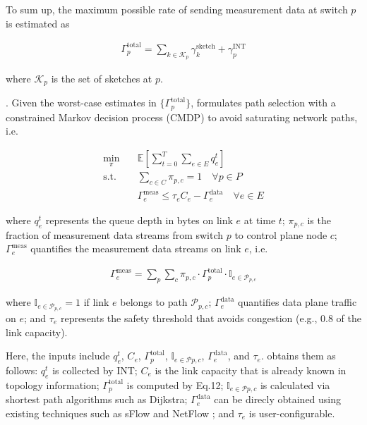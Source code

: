 To sum up, the maximum possible rate of sending measurement data at switch $p$ is estimated as

\vspace{-4pt}
\begin{align}
\Gamma_p^{\text{total}} = \sum_{k \in \mathcal{K}_p} \gamma_k^{\text{sketch}} + \gamma_p^{\text{INT}}
\end{align}

\noindent where $\mathcal{K}_p$ is the set of sketches at $p$. 


. Given the worst-case estimates in $\{\Gamma_p^{\text{total}}\}$, \sysname formulates path selection with a constrained Markov decision process (CMDP) to avoid saturating network paths, i.e.

\vspace{-4pt}
\begin{align}
\min_{\pi}  & \quad \mathbb{E}\left[\sum_{t=0}^T \sum_{e \in E} q_e^t \right] \\
\text{s.t.} & \quad \sum_{c \in C} \pi_{p,c} = 1 \quad \forall p \in P  \\
            & \quad \Gamma_e^{\text{meas}} \leq \tau_e C_e - \Gamma_e^{\text{data}} \quad \forall e \in E 
\end{align}

\noindent where $q_e^t$ represents the queue depth in bytes on link $e$ at time $t$; $\pi_{p,c}$ is the fraction of measurement data streams from switch $p$ to control plane node $c$; $\Gamma_e^{\text{meas}}$ quantifies the measurement data streams on link $e$, i.e. 

\vspace{-4pt}
\begin{align}
    \Gamma_e^{\text{meas}} = \sum_{p} \sum_{c} \pi_{p,c} \cdot \Gamma_p^{\text{total}} \cdot \mathbb{I}_{e \in \mathcal{P}_{p,c}}
\end{align}

\noindent where $\mathbb{I}_{e \in \mathcal{P}_{p,c}}=1$ if link $e$ belongs to path $\mathcal{P}_{p,c}$; $\Gamma_e^{\text{data}}$ quantifies data plane traffic on $e$; and $\tau_e$ represents the safety threshold that avoids congestion (e.g., 0.8 of the link capacity).

Here, the inputs include $q_e^t$, $C_e$, $\Gamma_p^{\text{total}}$, $\mathbb{I}_{e \in \mathcal{P}{p,c}}$, $\Gamma_e^{\text{data}}$, and $\tau_e$. \sysname obtains them as follows: $q_e^t$ is collected by INT; $C_e$ is the link capacity that is already known in topology information; $\Gamma_p^{\text{total}}$ is computed by Eq.12; $\mathbb{I}_{e \in \mathcal{P}{p,c}}$ is calculated via shortest path algorithms such as Dijkstra; $\Gamma_e^{\text{data}}$ can be direcly obtained using existing techniques such as sFlow \cite{sFlow} and NetFlow \cite{netflow}; and $\tau_e$ is user-configurable. 

